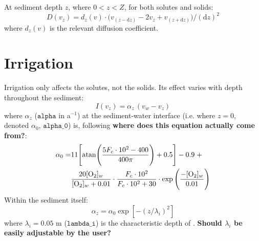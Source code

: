 \documentclass[a4paper]{article}
\newcommand{\D}[1]{\mathrm{d}#1}
\newcommand{\code}[1]{\texttt{#1}}
\newcommand{\wtf}[1]{\textcolor{Cerulean}{\textbf{#1}}}
\begin{document}
At sediment depth $z$, where $0 < z < Z$, for both solutes and solids:
\begin{equation}\label{eq:diffusion}
D(v_z) = d_z(v) \cdot \big( v_{(z-\D{z})} - 2 v_z + v_{(z+\D{z})} \big) / (\D{z})^2
\end{equation}
where $d_z(v)$ is the relevant diffusion coefficient.



\section{Irrigation}\label{sx:irrigation}

Irrigation only affects the solutes, not the solids. Its effect varies with depth throughout the sediment:
\begin{equation}
I(v_z) = \alpha_z \, (v_w - v_z)
\end{equation}
where $\alpha_z$ ($\code{alpha}$ in a$^{-1}$) at the sediment-water interface (i.e. where $z = 0$, denoted $\alpha_0$, $\code{alpha\_0}$) is, following \wtf{where does this equation actually come from?}:
\begin{equation}
\begin{split}
\alpha_0 = & 11 \Bigg[ \mathrm{atan} \Bigg( \frac{5 F_c \cdot 10^2 - 400}{400 \pi} \Bigg) + 0.5 \Bigg] - 0.9 \; + \\
& \frac{20 [\ce{O2}]_w}{[\ce{O2}]_w + 0.01} \cdot \frac{F_c \cdot 10^2}{F_c \cdot 10^2 + 30} \cdot \exp \Bigg(\frac{-[\ce{O2}]_w}{0.01}\Bigg)
\end{split}
\end{equation}
Within the sediment itself:
\begin{equation}
\alpha_z = \alpha_0 \exp [-(z/\lambda_i)^2]
\end{equation}
where $\lambda_i = 0.05$ m ($\code{lambda\_i}$) is the characteristic depth of \citet{archer_model_2002}. \wtf{Should $\lambda_i$ be easily adjustable by the user?}



\end{document}
